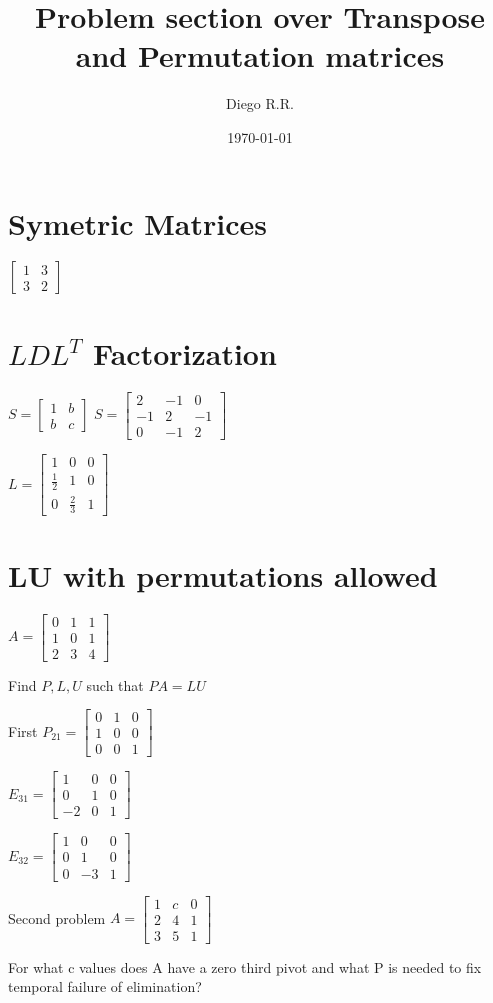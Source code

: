 \documentclass{extarticle}
\title{Problem section over Transpose and Permutation matrices}
\author{Diego R.R.}
\date{\today}
\begin{document}
\section{Symetric Matrices}
$\begin{bmatrix}
    1 & 3 \\
    3 & 2
\end{bmatrix}$

\section{$LDL^T$ Factorization}
$S = \begin{bmatrix}
    1 & b \\
    b & c
\end{bmatrix}$
$S = \begin{bmatrix}
    2 & -1 & 0\\
    -1 & 2 & -1\\
    0 & -1 & 2
\end{bmatrix}$

$L = \begin{bmatrix}
    1 & 0 & 0\\
    \frac{1}{2} & 1 & 0\\
    0 & \frac{2}{3} & 1
\end{bmatrix}$

\section{LU with permutations allowed}
$A = \begin{bmatrix}
    0 & 1 & 1\\
    1 & 0 & 1\\
    2 & 3 & 4   
\end{bmatrix}$

Find $P, L, U$ such that $PA = LU$

First $P_{21} = \begin{bmatrix}
    0 & 1 & 0\\
    1 & 0 & 0\\
    0 & 0 & 1
\end{bmatrix}$

$E_{31} = \begin{bmatrix}
    1 & 0 & 0\\
    0 & 1 & 0\\
    -2 & 0 & 1
\end{bmatrix}$

$E_{32} = \begin{bmatrix}
    1 & 0 & 0\\
    0 & 1 & 0\\
    0 & -3 & 1
\end{bmatrix}$

Second problem
$A = \begin{bmatrix}
    1 & c & 0 \\
    2 & 4 & 1 \\
    3 & 5 & 1 
\end{bmatrix}$

For what c values does A have a zero third pivot and what P is needed
to fix temporal failure of elimination?
\end{document}
